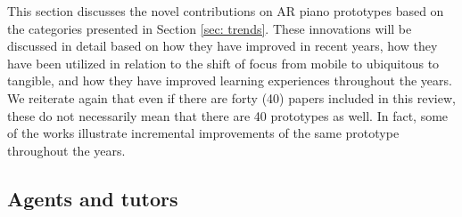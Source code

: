 \documentclass[sigchi, review]{acmart}
\begin{document}
This section discusses the novel contributions on AR piano prototypes based on the categories presented in Section \ref{sec: trends}. These innovations will be discussed in detail based on how they have improved in recent years, how they have been utilized in relation to the shift of focus from mobile to ubiquitous to tangible, and how they have improved learning experiences throughout the years. We reiterate again that even if there are forty (40) papers included in this review, these do not necessarily mean that there are 40 prototypes as well. In fact, some of the works illustrate incremental improvements of the same prototype throughout the years. 

\subsection{Agents and tutors}
\label{subsec: agent}
\end{document}
